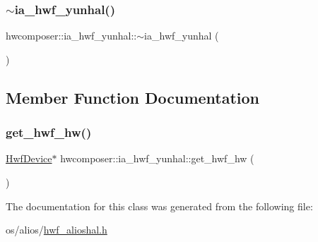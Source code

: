 \mbox{\label{classhwcomposer_1_1ia__hwf__yunhal_aa9e8f2cb623db54a19932c5939f6b739}} 
\subsubsection{\texorpdfstring{$\sim$ia\+\_\+hwf\+\_\+yunhal()}{~ia\_hwf\_yunhal()}}
{\footnotesize\ttfamily hwcomposer\+::ia\+\_\+hwf\+\_\+yunhal\+::$\sim$ia\+\_\+hwf\+\_\+yunhal (\begin{DoxyParamCaption}{ }\end{DoxyParamCaption})}



\subsection{Member Function Documentation}
\mbox{\label{classhwcomposer_1_1ia__hwf__yunhal_ab9de8cdc6e6fc4bbb2eb354afa86a597}} 
\subsubsection{\texorpdfstring{get\+\_\+hwf\+\_\+hw()}{get\_hwf\_hw()}}
{\footnotesize\ttfamily \mbox{\hyperlink{structhwcomposer_1_1HwfDevice}{Hwf\+Device}}$\ast$ hwcomposer\+::ia\+\_\+hwf\+\_\+yunhal\+::get\+\_\+hwf\+\_\+hw (\begin{DoxyParamCaption}{ }\end{DoxyParamCaption})}



The documentation for this class was generated from the following file\+:\begin{DoxyCompactItemize}
\item 
os/alios/\mbox{\hyperlink{hwf__alioshal_8h}{hwf\+\_\+alioshal.\+h}}\end{DoxyCompactItemize}
